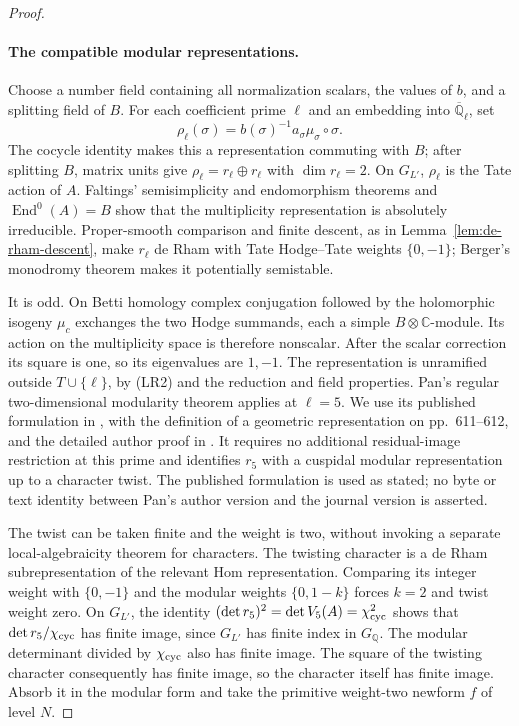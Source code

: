 \begin{proof}
\paragraph{The compatible modular representations.}
Choose a number field containing all normalization scalars, the values
of $b$, and a splitting field of $B$. For each coefficient prime $\ell$
and an embedding into $\overline{\mathbb Q}_\ell$, set
\[
 \rho_\ell(\sigma)=b(\sigma)^{-1}a_\sigma\mu_\sigma\circ\sigma.
\]
The cocycle identity makes this a representation commuting with $B$;
after splitting $B$, matrix units give $\rho_\ell=r_\ell\oplus r_\ell$
with $\dim r_\ell=2$. On $G_{L'}$, $\rho_\ell$ is the Tate action of
$A$. Faltings' semisimplicity and endomorphism theorems and $\operatorname{End}^0(A)=B$
show that the multiplicity representation is absolutely irreducible.
Proper-smooth comparison and finite descent, as in
Lemma~\ref{lem:de-rham-descent}, make $r_\ell$ de Rham with Tate
Hodge--Tate weights $\{0,-1\}$; Berger's monodromy theorem makes it
potentially semistable.

It is odd. On Betti homology complex conjugation followed by the
holomorphic isogeny $\mu_c$ exchanges the two Hodge summands, each
a simple $B\otimes\mathbb C$-module. Its action on the multiplicity
space is therefore nonscalar. After the scalar correction its square
is one, so its eigenvalues are $1,-1$. The representation is unramified
outside $T\cup\{\ell\}$, by (LR2) and the reduction and field properties.
Pan's regular two-dimensional modularity theorem applies at $\ell=5$.
We use its published formulation in \cite[Section 7, p.~624]{calegari-icm2022},
with the definition of a geometric representation on pp.~611--612,
and the detailed author proof in \cite[Theorem 1.0.4]{pan2022}.
It requires no additional residual-image restriction at this prime and
identifies $r_5$ with a cuspidal modular representation up to a character
twist. The published formulation is used as stated; no byte or text
identity between Pan's author version and the journal version is asserted.

The twist can be taken finite and the weight is two, without invoking
a separate local-algebraicity theorem for characters. The twisting
character is a de Rham subrepresentation of the relevant Hom
representation. Comparing its integer weight with $\{0,-1\}$ and
the modular weights $\{0,1-k\}$ forces $k=2$ and twist weight zero.
On $G_{L'}$, the identity
$(\det r_5)^2=\det V_5(A)=\chi_{\rm cyc}^2$ shows that
$\det r_5/\chi_{\rm cyc}$ has finite image, since $G_{L'}$ has finite
index in $G_{\mathbb Q}$. The modular determinant
divided by $\chi_{\rm cyc}$ also has finite image. The square of the
twisting character consequently has finite image, so the character
itself has finite image. Absorb it in the modular form and take the
primitive weight-two newform $f$ of level $N$.


\end{proof}

